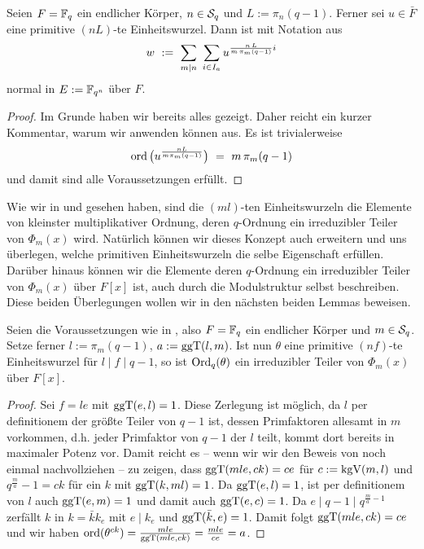 \begin{satz}
  Seien $F = \F_q$ ein endlicher Körper, $n\in \S_q$ und $L:=\pi_n(q-1)$.
  Ferner sei $u \in \bar F$ eine primitive $(nL)$-te Einheitswurzel. Dann ist
  mit Notation aus 
  \[ w \speq{:=} \sum_{m\mid n} \ \sum_{i\in I_a}
    u^{\frac{n\, L}{m\, \pi_m(q-1)}i}\]
  normal in $E := \F_{q^n}$ über $F$.
\end{satz}
\begin{proof}
  Im Grunde haben wir bereits alles gezeigt. Daher reicht ein kurzer Kommentar,
  warum wir  anwenden können aus. Es ist
  trivialerweise 
  \[ \ord\big( u^{\frac{nL}{m\pi_m(q-1)}} \big) \speq=
    m\, \pi_m(q-1)\]
  und damit sind alle Voraussetzungen erfüllt.
\end{proof}

\begin{bemerkung}
  Wie wir in  und 
  gesehen haben, sind die $(ml)$-ten Einheitswurzeln die Elemente von kleinster
  multiplikativer Ordnung, deren $q$-Ordnung ein irreduzibler Teiler von
  $\Phi_m(x)$ wird. Natürlich können wir dieses Konzept auch erweitern und uns
  überlegen, welche primitiven Einheitswurzeln die selbe Eigenschaft erfüllen.
  Darüber hinaus können wir die Elemente deren $q$-Ordnung ein irreduzibler
  Teiler von $\Phi_m(x)$ über $F[x]$ ist, auch durch die Modulstruktur selbst
  beschreiben.
  Diese beiden Überlegungen wollen wir in den nächsten beiden Lemmas beweisen.
\end{bemerkung}

\begin{lemma}
  \label{lemma:hoehere_wurzeln_auch_erzeuger}
  Seien die Voraussetzungen wie in , also
  $F = \F_q$ ein endlicher Körper und $m\in \S_q$. Setze ferner 
  $l := \pi_m(q-1)$, $a := \ggT(l,m)$. 
  Ist nun $\theta$ eine primitive $(nf)$-te Einheitswurzel für 
  $l \mid f \mid q-1$, so ist $\Ord_q(\theta)$ ein irreduzibler Teiler
  von $\Phi_m(x)$ über $F[x]$.
\end{lemma}
\begin{proof}
  Sei $f = le$ mit $\ggT(e,l) = 1$. Diese Zerlegung ist möglich, da
  $l$ per definitionem der größte Teiler von $q-1$ ist, dessen Primfaktoren
  allesamt in $m$ vorkommen, d.h. jeder Primfaktor von $q-1$ der $l$ teilt,
  kommt dort bereits in maximaler Potenz vor.
  Damit reicht es -- wenn wir wir den Beweis von
   noch einmal nachvollziehen -- zu zeigen,
  dass $\ggT(mle, ck) = ce$ für $c := \kgV(m,l)$ und 
  $q^{\frac m a} -1 = ck$ für ein $k$ mit $\ggT(k,ml) = 1$. Da $\ggT(e,l) = 1$,
  ist per definitionem von $l$ auch $\ggT(e,m) = 1$ und damit auch
  $\ggT(e,c) = 1$. Da $e \mid q-1\mid q^{\frac m a -1}$ zerfällt $k$ 
  in $k = \bar k k_e$ mit $e \mid k_e$ und $\ggT(\bar k,e) = 1$. Damit
  folgt $\ggT(mle, ck) = ce$ und wir haben
  $\ord(\theta^{ck}) = \frac{mle}{\ggT(mle,ck)} = \frac{mle}{ce} = a$.
\end{proof}

